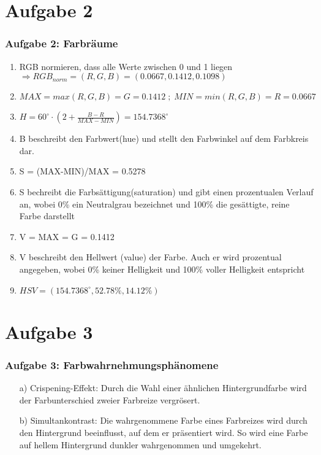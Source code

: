 \documentclass[accentcolor=tud9c,colorbacktitle,inverttitle,landscape,german,presentation,t]{tudbeamer}
\begin{document}
\section{Aufgabe 2}
	\begin{frame}
		\frametitle{Aufgabe 2: Farbräume}
			\begin{enumerate}
			\item RGB normieren, dass alle Werte zwischen 0 und 1 liegen
			$\Rightarrow RGB_{norm} = (R, G, B) = (0.0667, 0.1412, 0.1098)$
			\item $MAX = max(R, G, B) = G = 0.1412 \; ; \; MIN = min(R, G, B) = R = 0.0667$
			\item  $H = 60 ^{\circ} \cdot (2 + \frac{B-R}{MAX-MIN}) = 154.7368^{\circ}$
			\item  B beschreibt den Farbwert(hue) und stellt den Farbwinkel auf dem Farbkreis dar.
			\item S = (MAX-MIN)/MAX = 0.5278
			\item S bechreibt die Farbsättigung(saturation) und gibt einen prozentualen Verlauf an, wobei 0\% ein Neutralgrau bezeichnet und 100\% die gesättigte, reine Farbe darstellt \
			\item V = MAX = G = 0.1412
			\item V beschreibt den Hellwert (value) der Farbe. Auch er wird prozentual angegeben, wobei 0\% keiner Helligkeit und 100\% voller Helligkeit entspricht
			\item $HSV = (154.7368^{\circ}, 52.78\%, 14.12\%)$
			\end{enumerate}
		\end{frame}

\section{Aufgabe 3}
	\begin{frame}
		\frametitle{Aufgabe 3: Farbwahrnehmungsphänomene}
		\begin{itemize}
			\item[a)]Crispening-Effekt: Durch die Wahl einer ähnlichen Hintergrundfarbe wird der Farbunterschied zweier Farbreize vergrösert.
			\item[b)]Simultankontrast: Die wahrgenommene Farbe eines Farbreizes wird durch den Hintergrund beeinflusst, auf dem er präsentiert wird. So wird eine Farbe auf hellem Hintergrund dunkler wahrgenommen und umgekehrt.
		\end{itemize}
	\end{frame}
\end{document}
